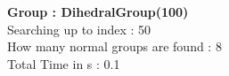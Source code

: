 \textbf{Group : DihedralGroup(100)}\\
Searching up to index : 50\\
How many normal groups are found : 8\\
Total Time in s : 0.1\\
